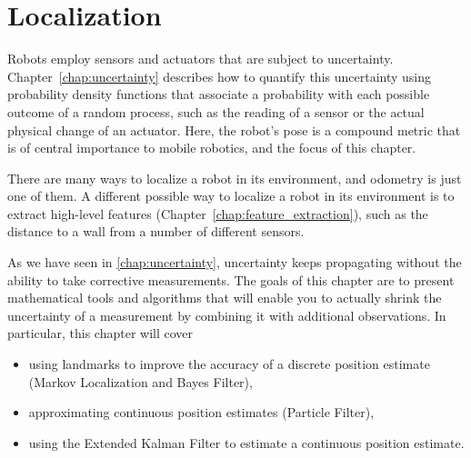 \chapter{Localization}\label{chap:localization}
Robots employ sensors and actuators that are subject to uncertainty. Chapter~\ref{chap:uncertainty} describes how to quantify this uncertainty using probability density functions that associate a probability with each possible outcome of a random process, such as the reading of a sensor or the actual physical change of an actuator. Here, the robot's pose is a compound metric that is of central importance to mobile robotics, and the focus of this chapter.


There are many ways to localize a robot in its environment, and odometry is just one of them. A different possible way to localize a robot in its environment is to extract high-level features (Chapter~\ref{chap:feature_extraction}), such as the distance to a wall from a number of different sensors. %

As we have seen in \cref{chap:uncertainty}, uncertainty keeps propagating without the ability to take corrective measurements. The goals of this chapter are to present mathematical tools and algorithms that will enable you to actually shrink the uncertainty of a measurement by combining it with additional observations.  In particular, this chapter will cover
\begin{itemize}
    \item using landmarks to improve the accuracy of a discrete position estimate (Markov Localization and Bayes Filter),
    \item approximating continuous position estimates (Particle Filter),
    \item using the Extended Kalman Filter to estimate a continuous position estimate.
\end{itemize}

